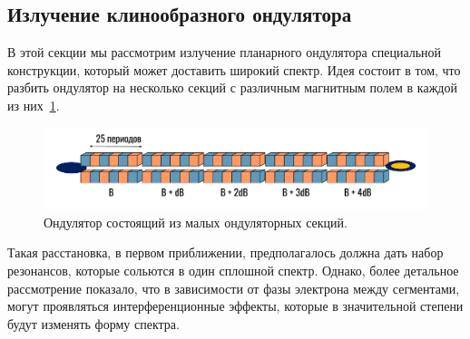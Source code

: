 \subsection{Излучение клинообразного ондулятора}
В этой секции мы рассмотрим излучение планарного ондулятора специальной конструкции, который может доставить широкий спектр. Идея состоит в том, что разбить ондулятор на несколько секций с различным магнитным полем в каждой из них~\ref{fig:section_und_sheme}.
\begin{figure}[h]
	\centering  
	\includegraphics[width=\textwidth]{pic/und.pdf}
	\caption{Ондулятор состоящий из малых ондуляторных секций.}
	\label{fig:section_und_sheme}  
\end{figure}
Такая расстановка, в первом приближении, предполагалось должна дать набор резонансов, которые сольются в один сплошной спектр. Однако, более детальное рассмотрение показало, что в зависимости от фазы электрона между сегментами, могут проявляться интерференционные эффекты, которые в значительной степени будут изменять форму спектра. 


